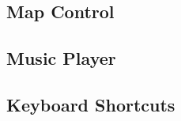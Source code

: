 \subsection{Map Control}

\subsection{Music Player}

\subsection{\label{shortcuts}Keyboard Shortcuts}

